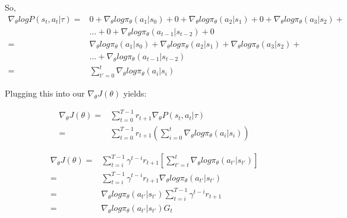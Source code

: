 \documentclass[letterpaper,11pt]{article}
\begin{document}
So, 
$$
\begin{aligned}
    \nabla_{\theta} log P(s_{t}, a_{t} | \tau) ={}& 0 + \nabla_{\theta} log \pi_{\theta}(a_{1} | s_{0}) + 0 + \nabla_{\theta} log \pi_{\theta}(a_{2} | s_{1}) + 0 + \nabla_{\theta} log \pi_{\theta}(a_{3} | s_{2}) + \\ & {} ... {} + {} 0 + \nabla_{\theta} log \pi_{\theta}(a_{t-1} | s_{t-2}) + 0 \\ ={}& \nabla_{\theta} log \pi_{\theta}(a_{1} | s_{0}) + \nabla_{\theta} log \pi_{\theta}(a_{2} | s_{1}) + \nabla_{\theta} log \pi_{\theta}(a_{3} | s_{2}) + \\
& ... + \nabla_{\theta} log \pi_{\theta}(a_{t-1} | s_{t-2}) \\ ={}& \sum\limits_{t'=0}^{t} \nabla_{\theta} log \pi_{\theta}(a_{i} | s_{i})                                                
\end{aligned}
$$

Plugging this into our $\nabla_{\theta} J(\theta)$ yields:

$$
\begin{aligned}
    \nabla_{\theta} J(\theta) ={}& \sum\limits_{t=0}^{T-1} r_{t+1} \nabla_{\theta} P(s_{t}, a_{t} | \tau) \\ ={}& \sum\limits_{t=0}^{T-1} r_{t+1} (\sum_{i=0}^{t} \nabla_{\theta} log \pi_{\theta}(a_{i} | s_{i}))
\end{aligned}
$$

$$
\begin{aligned}
    \nabla_{\theta} J(\theta) ={}& \sum\limits_{t = i}^{T - 1} \gamma^{t - i} r_{t+1} [\sum\limits_{t' = t}^{t} \nabla_{\theta} log \pi_{\theta}(a_{t'} | s_{t'})] \\
    ={}& \sum\limits_{t = i}^{T - 1} \gamma^{t - i} r_{t+1}  \nabla_{\theta} log \pi_{\theta}(a_{t'} | s_{t'}) \\
    ={}& \nabla_{\theta} log \pi_{\theta}(a_{t'} | s_{t'}) \sum\limits_{t = i}^{T - 1} \gamma^{t - i} r_{t+1} \\
    ={}& \nabla_{\theta} log \pi_{\theta}(a_{t'} | s_{t'}) G_{t} 
\end{aligned}
$$
\end{document}
